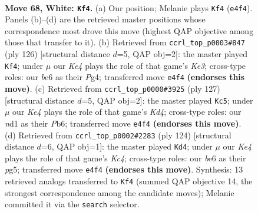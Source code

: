 \documentclass[11pt]{article}
\begin{document}
\clearpage

\begin{figure}[p]\centering
\begin{subfigure}{0.46\textwidth}\centering
\resizebox{\linewidth}{!}{%
\newchessgame
\chessboard[
  setfen={8/k7/4b3/P7/1P2K3/8/8/3n4 w - - 2 68},
  showmover=false,
  pgfstyle=straightmove, color=movearrow, markmove={e4-f4}
]}
\caption{}
\end{subfigure}\hfill
\begin{subfigure}{0.46\textwidth}\centering
\resizebox{\linewidth}{!}{%
\newchessgame
\chessboard[
  setfen={8/6k1/8/6P1/6PP/1n2K3/8/8 w - - 1 64},
  showmover=false,
  pgfstyle=straightmove, color=movearrow, markmove={e3-f4}
]}
\caption{}
\end{subfigure}
\\[4pt]
\begin{subfigure}{0.46\textwidth}\centering
\resizebox{\linewidth}{!}{%
\newchessgame
\chessboard[
  setfen={8/5B2/1p6/3k2p1/7p/8/6K1/8 b - - 3 64},
  showmover=false,
  pgfstyle=straightmove, color=movearrow, markmove={d5-c5}
]}
\caption{}
\end{subfigure}\hfill
\begin{subfigure}{0.46\textwidth}\centering
\resizebox{\linewidth}{!}{%
\newchessgame
\chessboard[
  setfen={8/8/1Pk5/P5p1/2K5/6n1/8/8 w - - 1 63},
  showmover=false,
  pgfstyle=straightmove, color=movearrow, markmove={c4-d4}
]}
\caption{}
\end{subfigure}
\caption{\textbf{Move 68, White: \texttt{Kf4}.} (a) Our position; Melanie plays \texttt{Kf4} (\texttt{e4f4}). Panels (b)--(d) are the retrieved master positions whose correspondence most drove this move (highest QAP objective among those that transfer to it). (b) Retrieved from \texttt{ccrl\_top\_p0003\#847} (ply 126) [structural distance $d$=5, QAP obj=2]: the master played \texttt{Kf4}; under $\mu$ our \emph{Ke4} plays the role of that game's \emph{Ke3}; cross-type roles: our \emph{b}e6 as their \emph{P}g4; transferred move \texttt{e4f4} \textbf{(endorses this move)}. (c) Retrieved from \texttt{ccrl\_top\_p0000\#3925} (ply 127) [structural distance $d$=5, QAP obj=2]: the master played \texttt{Kc5}; under $\mu$ our \emph{Ke4} plays the role of that game's \emph{Kd4}; cross-type roles: our \emph{n}d1 as their \emph{P}b6; transferred move \texttt{e4f4} \textbf{(endorses this move)}. (d) Retrieved from \texttt{ccrl\_top\_p0002\#2283} (ply 124) [structural distance $d$=6, QAP obj=1]: the master played \texttt{Kd4}; under $\mu$ our \emph{Ke4} plays the role of that game's \emph{Kc4}; cross-type roles: our \emph{b}e6 as their \emph{p}g5; transferred move \texttt{e4f4} \textbf{(endorses this move)}. Synthesis: 13 retrieved analogs transferred to \texttt{Kf4} (summed QAP objective 14, the strongest correspondence among the candidate moves); Melanie committed it via the \texttt{search} selector.}
\label{fig:thought-m134}
\end{figure}
\end{document}
